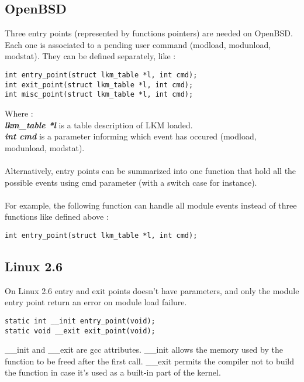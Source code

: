 \documentclass[11pt]{report}
\begin{document}
  \subsection{OpenBSD}
  Three entry points (represented by functions pointers) are needed on OpenBSD.
  Each one is associated to a pending user command (modload, modunload, modstat).
  They can be defined separately, like :
    \begin{lstlisting}
int entry_point(struct lkm_table *l, int cmd);
int exit_point(struct lkm_table *l, int cmd);
int misc_point(struct lkm_table *l, int cmd);
    \end{lstlisting}
    Where :\\
{\bf \it lkm\_table *l} is a table description of LKM loaded.\\
{\bf \it int cmd} is a parameter informing which event has occured (modload, modunload, modstat).\\\\
Alternatively, entry points can be summarized into one function that hold 
all the possible events using cmd parameter (with a switch case for instance).\\\\
For example, the following function can handle all module events instead of three functions
like defined above :
    \begin{lstlisting}
int entry_point(struct lkm_table *l, int cmd);
    \end{lstlisting}

  \subsection{Linux 2.6}
On Linux 2.6 entry and exit points doesn't have parameters, and only the module
entry point return an error on module load failure.
    \begin{lstlisting}
static int __init entry_point(void);
static void __exit exit_point(void);
    \end{lstlisting}
\_\_init and \_\_exit are gcc attributes.
\_\_init allows the memory used by the function to be freed after the first call.
\_\_exit permits the compiler not to build the function in case it's used as a built-in
part of the kernel.
\end{document}
